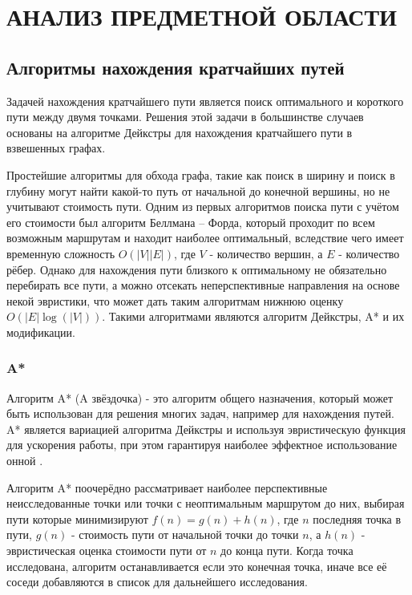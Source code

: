 \section[Анализ предметной области]{\MakeTextUppercase{АНАЛИЗ ПРЕДМЕТНОЙ ОБЛАСТИ}}
\subsection{Алгоритмы нахождения кратчайших путей}

Задачей нахождения кратчайшего пути является поиск оптимального и короткого пути между двумя точками. Решения этой задачи в большинстве случаев основаны на алгоритме Дейкстры \cite{Dijkstra} для нахождения кратчайшего пути в взвешенных графах. 

Простейшие алгоритмы для обхода графа, такие как поиск в ширину и поиск в глубину могут найти какой-то путь от начальной до конечной вершины, но не учитывают стоимость пути. Одним из первых алгоритмов поиска пути с учётом его стоимости был алгоритм Беллмана -- Форда, который проходит по всем возможным маршрутам и находит наиболее оптимальный, вследствие чего имеет временную сложность $O(|V||E|)$, где $V$ - количество вершин, а $E$ - количество рёбер. Однако для нахождения пути близкого к оптимальному не обязательно перебирать все пути, а можно отсекать неперспективные направления на основе некой эвристики, что может дать таким алгоритмам нижнюю оценку $O(|E|\log(|V|))$. Такими алгоритмами являются алгоритм Дейкстры, A* и их модификации.

\subsubsection{A*}

Алгоритм A{*} (A звёздочка) - это алгоритм общего назначения, который может быть использован для решения многих задач, например для нахождения путей. A{*} является вариацией алгоритма Дейкстры и используя эвристическую функция для ускорения работы, при этом гарантируя наиболее эффектное использование онной \cite{A_STAR}. 

Алгоритм A{*} поочерёдно рассматривает наиболее перспективные неисследованные точки или точки с неоптимальным маршрутом до них, выбирая пути которые минимизируют $ f(n) = g(n) + h(n) $, где $n$ последняя точка в пути, $g(n)$ - стоимость пути от начальной точки до точки $n$, а $h(n)$ - эвристическая оценка стоимости пути от $n$ до конца пути. Когда точка исследована, алгоритм останавливается если это конечная точка, иначе все её соседи добавляются в список для дальнейшего исследования.

